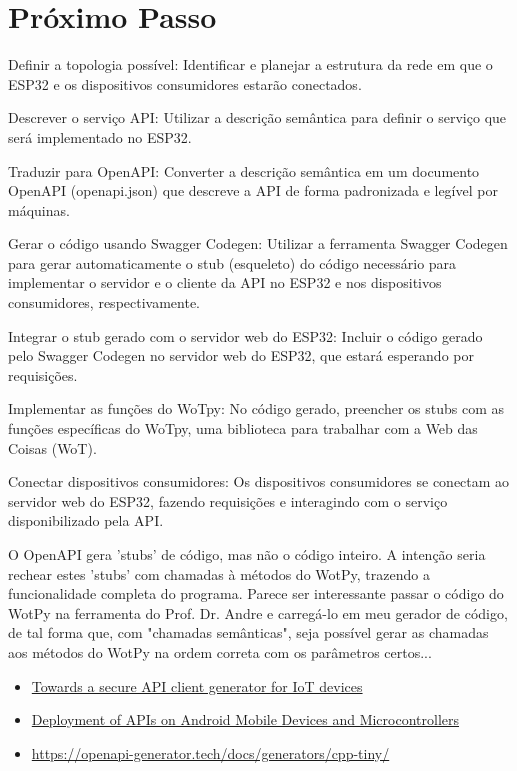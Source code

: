 
\section{Próximo Passo}

Definir a topologia possível: Identificar e planejar a estrutura da rede em que o ESP32 e os dispositivos consumidores estarão conectados.

Descrever o serviço API: Utilizar a descrição semântica para definir o serviço que será implementado no ESP32.

Traduzir para OpenAPI: Converter a descrição semântica em um documento OpenAPI (openapi.json) que descreve a API de forma padronizada e legível por máquinas.

Gerar o código usando Swagger Codegen: Utilizar a ferramenta Swagger Codegen para gerar automaticamente o stub (esqueleto) do código necessário para implementar o servidor e o cliente da API no ESP32 e nos dispositivos consumidores, respectivamente.

Integrar o stub gerado com o servidor web do ESP32: Incluir o código gerado pelo Swagger Codegen no servidor web do ESP32, que estará esperando por requisições.

Implementar as funções do WoTpy: No código gerado, preencher os stubs com as funções específicas do WoTpy, uma biblioteca para trabalhar com a Web das Coisas (WoT).

Conectar dispositivos consumidores: Os dispositivos consumidores se conectam ao servidor web do ESP32, fazendo requisições e interagindo com o serviço disponibilizado pela API.

O OpenAPI gera 'stubs' de código, mas não o código inteiro. A intenção seria rechear estes 'stubs' com chamadas à métodos do WotPy, trazendo a funcionalidade completa do programa. Parece ser interessante passar o código do WotPy na ferramenta do Prof. Dr. Andre e carregá-lo em meu gerador de código, de tal forma que, com "chamadas semânticas", seja possível gerar as chamadas aos métodos do WotPy na ordem correta com os parâmetros certos...

\begin{itemize}
    \item \href{https://arxiv.org/pdf/2201.00270.pdf}{Towards a secure API client generator for IoT devices}
    \item \href{https://ieeexplore.ieee.org/document/9156208}{Deployment of APIs on Android Mobile Devices and Microcontrollers}
    \item \url{https://openapi-generator.tech/docs/generators/cpp-tiny/}
\end{itemize}

